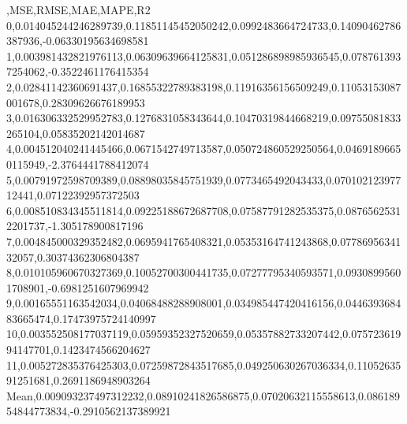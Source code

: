 ,MSE,RMSE,MAE,MAPE,R2
0,0.014045244246289739,0.11851145452050242,0.0992483664724733,0.14090462786387936,-0.06330195634698581
1,0.003981432821976113,0.06309639664125831,0.051286898985936545,0.0787613937254062,-0.3522461176415354
2,0.02841142360691437,0.16855322789383198,0.11916356156509249,0.11053153087001678,0.28309626676189953
3,0.016306332529952783,0.1276831058343644,0.10470319844668219,0.09755081833265104,0.05835202142014687
4,0.004512040241445466,0.0671542749713587,0.050724860529250564,0.04691896650115949,-2.3764441788412074
5,0.00791972598709389,0.08898035845751939,0.0773465492043433,0.07010212397712441,0.07122392957372503
6,0.008510834345511814,0.09225188672687708,0.07587791282535375,0.08765625312201737,-1.305178900817196
7,0.004845000329352482,0.0695941765408321,0.05353164741243868,0.0778695634132057,0.30374362306804387
8,0.010105960670327369,0.10052700300441735,0.07277795340593571,0.09308995601708901,-0.6981251607969942
9,0.00165551163542034,0.04068488288908001,0.034985447420416156,0.044639368483665474,0.17473975724140997
10,0.003552508177037119,0.05959352327520659,0.05357882733207442,0.07572361994147701,0.1423474566204627
11,0.005272835376425303,0.07259872843517685,0.049250630267036334,0.1105263591251681,0.2691186948903264
Mean,0.009093237497312232,0.08910241826586875,0.07020632115558613,0.08618954844773834,-0.2910562137389921
